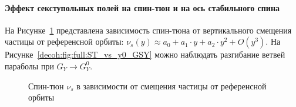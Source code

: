 \paragraph{Эффект секступольных полей на спин-тюн и на ось стабильного спина}\label{par:Sextupole-effect-on-spin-tune-and-nbar}
На Рисунке~\ref{decoh:fig:ST_vs_y0_GSY} представлена зависимость спин-тюна от вертикального смещения частицы от референсной орбиты: ${\nu_s(y) \approx a_0 + a_1\cdot y + a_2\cdot y^2 + O(y^3)}$. 
На Рисунке~\ref{decoh:fig:full:ST_vs_y0_GSY} можно наблюдать разгибание ветвей параболы 
при ${G_Y \rightarrow G_Y^0}$.
\begin{figure}[H]
	\centering
\end{figure}
\begin{figure}[H]\centering
	\caption{Спин-тюн $\nu_s$ в зависимости от смещения частицы от референсной орбиты\label{decoh:fig:ST_vs_y0_GSY}}
\end{figure}

